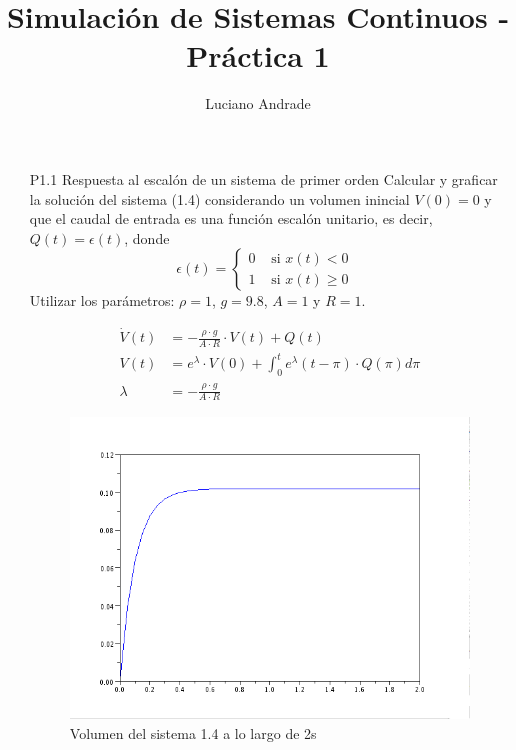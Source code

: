 \documentclass{article}
\begin{document}
\author{Luciano Andrade}
\title{Simulación de Sistemas Continuos - Práctica 1}
\maketitle

\begin{itemize}

  \item[P1.1] Respuesta al escalón de un sistema de primer orden
Calcular y graficar la solución del sistema (1.4) considerando un volumen inincial $ V(0)=0 $ y que el caudal de entrada es una función escalón unitario, es decir, $Q(t)=\epsilon(t)$, donde 
\begin{equation}
\epsilon(t) = \left\{ \begin{array}{rl}
  0 &\mbox{ si $x(t) < 0$} \\
  1 &\mbox{ si $x(t) \geq 0$ }
       \end{array} \right .
 \label{P1.1a} \tag{P1.1a}
\end{equation}
Utilizar los parámetros: $\rho = 1$, $g=9.8$, $A= 1$ y $R = 1$.

\begin{align*}
  \dot{V}(t) &= -\frac{\rho \cdot g}{A \cdot R} \cdot V(t) + Q(t) \\
  V(t) &= e^{\lambda} \cdot V(0) + \int_0^t e^{\lambda} (t - \pi) \cdot Q(\pi) d\pi \\
  \lambda &= -\frac{\rho \cdot g}{A \cdot R}
\end{align*}

\begin{figure}[h]
\includegraphics[width=\textwidth]{img/ej01.png}
\caption{Volumen del sistema 1.4 a lo largo de 2s}
\label{fig:p1.1}
\end{figure}


\end{itemize}
\end{document}
